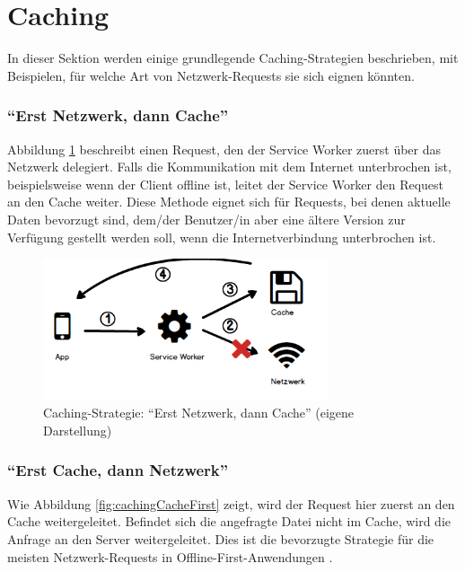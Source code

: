\documentclass[a4paper, 12pt]{scrreprt}
\begin{document}
\section{Caching}
In dieser Sektion werden einige grundlegende Caching-Strategien beschrieben, mit Beispielen, für welche Art von Netzwerk-Requests sie sich eignen könnten.

\subsubsection{\enquote{Erst Netzwerk, dann Cache}}
Abbildung \ref{fig:cachingNetworkFirst} beschreibt einen Request, den der Service Worker zuerst über das Netzwerk delegiert. Falls die Kommunikation mit dem Internet unterbrochen ist, beispielsweise wenn der Client offline ist, leitet der Service Worker den Request an den Cache weiter. Diese Methode eignet sich für Requests, bei denen aktuelle Daten bevorzugt sind, dem/der Benutzer/in aber eine ältere Version zur Verfügung gestellt werden soll, wenn die Internetverbindung unterbrochen ist.

\begin{figure}[H]
	\centering
	\includegraphics[width=0.75\textwidth]{networkfirst.png}
	\caption[Caching-Strategie: \enquote{Erst Netzwerk, dann Cache}]{Caching-Strategie: \enquote{Erst Netzwerk, dann Cache} (eigene Darstellung)}
	\label{fig:cachingNetworkFirst}
\end{figure}



\subsubsection{\enquote{Erst Cache, dann Netzwerk}}
\label{sec:cachedannnetzwerk}
Wie Abbildung \ref{fig:cachingCacheFirst} zeigt, wird der Request hier zuerst an den Cache weitergeleitet. Befindet sich die angefragte Datei nicht im Cache, wird die Anfrage an den Server weitergeleitet. Dies ist die bevorzugte Strategie für die meisten Netzwerk-Requests in Offline-First-Anwendungen \autocite[Kapitel 05]{BookBuildingPWAs}.
\end{document}
